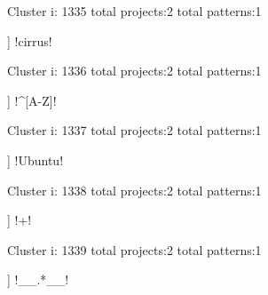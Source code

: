 Cluster i: 1335
total projects:2
total patterns:1
\begin{multicols}{1}
\begin{description}[noitemsep,topsep=0pt]
\item [[2] ] \cverb!cirrus!
\end{description}
\end{multicols}







Cluster i: 1336
total projects:2
total patterns:1
\begin{multicols}{1}
\begin{description}[noitemsep,topsep=0pt]
\item [[2] ] \cverb!^[A-Z]!
\end{description}
\end{multicols}







Cluster i: 1337
total projects:2
total patterns:1
\begin{multicols}{1}
\begin{description}[noitemsep,topsep=0pt]
\item [[2] ] \cverb!Ubuntu!
\end{description}
\end{multicols}







Cluster i: 1338
total projects:2
total patterns:1
\begin{multicols}{1}
\begin{description}[noitemsep,topsep=0pt]
\item [[2] ] \cverb!{\w+}!
\end{description}
\end{multicols}







Cluster i: 1339
total projects:2
total patterns:1
\begin{multicols}{1}
\begin{description}[noitemsep,topsep=0pt]
\item [[2] ] \cverb!__.*__!
\end{description}
\end{multicols}







